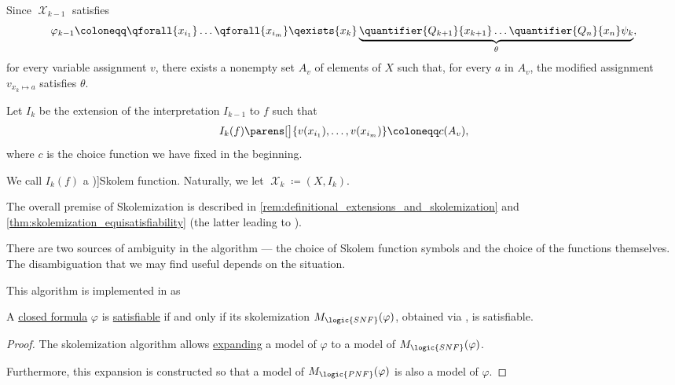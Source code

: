 \begin{algorithm}[Skolemization]
\begin{thmenum}
    Since \( \mscrX_{k-1} \) satisfies
    \begin{equation*}
      \varphi_{k-1} \coloneqq \qforall {x_{i_1}} \ldots \qforall {x_{i_m}} \qexists {x_k} \underbrace{\quantifier {Q_{k+1}} {x_{k+1}} \ldots \quantifier{Q_n} {x_n} \psi_k}_\theta,
    \end{equation*}
    for every variable assignment \( v \), there exists a nonempty set \( A_v \) of elements of \( X \) such that, for every \( a \) in \( A_v \), the modified assignment \( v_{x_k \mapsto a} \) satisfies \( \theta \).

    Let \( I_k \) be the extension of the interpretation \( I_{k-1} \) to \( f \) such that
    \begin{equation*}
      I_k(f)\parens[\big]{ v(x_{i_1}), \ldots, v(x_{i_m}) } \coloneqq c(A_v),
    \end{equation*}
    where \( c \) is the choice function we have fixed in the beginning.

    We call \( I_k(f) \) a \term[en=Skolem function (\cite[thm. 2.3.34]{Hinman2005Logic})]{Skolem function}. Naturally, we let \( \mscrX_k \coloneqq (X, I_k) \).
  \end{thmenum}
\end{algorithm}
\begin{comments}
  \item The overall premise of Skolemization is described in \cref{rem:definitional_extensions_and_skolemization} and \cref{thm:skolemization_equisatisfiability} (the latter leading to ).
  \item There are two sources of ambiguity in the algorithm --- the choice of Skolem function symbols and the choice of the functions themselves. The disambiguation that we may find useful depends on the situation.
  \item This algorithm is implemented in \cite{notebook:code} as
  \begin{CodeRefDisplay}
  \end{CodeRefDisplay}
\end{comments}

\begin{proposition}\label{thm:skolemization_equisatisfiability}
  A \hyperref[def:fol_closed_formula]{closed formula} \( \varphi \) is \hyperref[def:fol_semantics/model]{satisfiable} if and only if its skolemization \( M_{\logic{SNF}}(\varphi) \), obtained via , is satisfiable.
\end{proposition}
\begin{proof}
  The skolemization algorithm allows \hyperref[def:fol_structure_expansion]{expanding} a model of \( \varphi \) to a model of \( M_{\logic{SNF}}(\varphi) \).

  Furthermore, this expansion is constructed so that a model of \( M_{\logic{PNF}}(\varphi) \) is also a model of \( \varphi \).
\end{proof}

